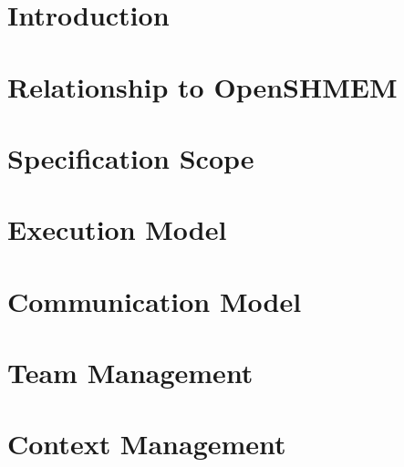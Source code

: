 \documentclass[10pt,oneside]{book}
\begin{document}
\setlength{\parskip}{3pt}



\section{Introduction}\label{sec:introduction}



\section{Relationship to OpenSHMEM}\label{sec:relationship}



\section{Specification Scope}\label{sec:scope}



\section{Execution Model}\label{sec:execution_model}



\section{Communication Model}\label{sec:communication_model}



\section{Team Management}\label{sec:team_management}



\section{Context Management}\label{sec:context_management}


\end{document}
